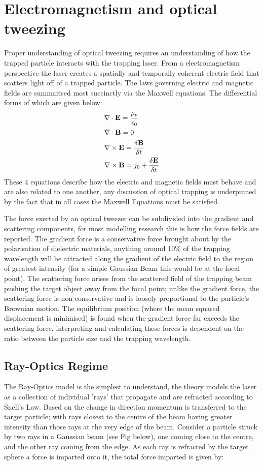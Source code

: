 \documentclass[a4paper,oneside,11pt]{book}
\begin{document}
\section{Electromagnetism and optical tweezing}
Proper understanding of optical tweezing requires an understanding of how the trapped particle interacts with the trapping laser. From a electromagnetism perspective the laser creates a spatially and temporally coherent electric field that scatters light off of a trapped particle. The laws governing electric and magnetic fields are summarised most succinctly via the Maxwell equations. The differential forms of which are given below:
\begin{align}
    &\nabla \cdot \bold{E} = \frac{\rho_ v}{\epsilon_0} \\
    &\nabla \cdot \bold{B} = 0 \\
    &\nabla \times \bold{E}  = \frac{\delta \bold{B}}{\delta t} \\
    &\nabla \times \bold{B} = j_0 +\frac{\delta \bold{E}}{\delta t}    
\end{align}
These 4 equations describe how the electric and magnetic fields must behave and are also related to one another, any discussion of optical trapping is underpinned by the fact that in all cases the Maxwell Equations must be satisfied. 

The force exerted by an optical tweezer can be subdivided into the gradient and scattering components, for most modelling research this is how the force fields are reported. The gradient force is a conservative force brought about by the polarisation of dielectric materials, anything around 10\% of the trapping wavelength will be attracted along the gradient of the electric field to the region of greatest intensity (for a simple Gaussian Beam this would be at the focal point). The scattering force arises from the scattered field of the trapping beam pushing the target object away from the focal point; unlike the gradient force, the scattering force is non-conservative and is loosely proportional to the particle's Brownian motion. The equilibrium position (where the mean squared displacement is minimised) is found when the gradient force far exceeds the scattering force, interpreting and calculating these forces is dependent on the ratio between the particle size and the trapping wavelength.

\subsection{Ray-Optics Regime}
The Ray-Optics model is the simplest to understand, the theory models the laser as a collection of individual 'rays' that propagate and are refracted according to Snell's Law. Based on the change in direction momentum is transferred to the target particle; with rays closest to the centre of the beam having greater intensity than those rays at the very edge of the beam. Consider a particle struck by two rays in a Gaussian beam (see Fig below), one coming close to the centre, and the other ray coming from the edge. As each ray is refracted by the target sphere a force is imparted onto it, the total force imparted is given by:
\end{document}
